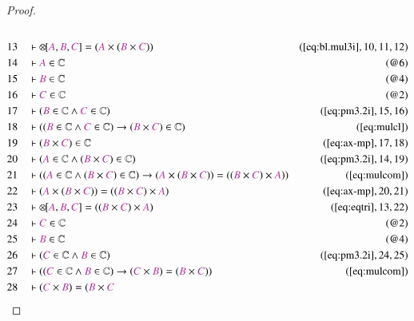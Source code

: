 \begin{proof}
\begin{align}
  \\ 13 &&  & \vdash {\otimes\hspace{-1pt}[} \mc{A} , \mc{B} , \mc{C} ] = (
      \mc{A} \times ( \mc{B} \times \mc{C} )
      )&(\mbox{\ref{eq:bl.mul3i}},10,11,12)\notag
  \\ 14 &&  & \vdash \mc{A} \in \mathbb{C}&(@6)\notag
  \\ 15 &&  & \vdash \mc{B} \in \mathbb{C}&(@4)\notag
  \\ 16 &&  & \vdash \mc{C} \in \mathbb{C}&(@2)\notag
  \\ 17 &&  & \vdash ( \mc{B} \in \mathbb{C} \wedge \mc{C} \in \mathbb{C}
      )&(\mbox{\ref{eq:pm3.2i}},15,16)\notag
  \\ 18 &&  & \vdash ( ( \mc{B} \in \mathbb{C} \wedge \mc{C} \in \mathbb{C} )
      \rightarrow ( \mc{B} \times \mc{C} ) \in \mathbb{C}
      )&(\mbox{\ref{eq:mulcl}})\notag
  \\ 19 &&  & \vdash ( \mc{B} \times \mc{C} ) \in
      \mathbb{C}&(\mbox{\ref{eq:ax-mp}},17,18)\notag
  \\ 20 &&  & \vdash ( \mc{A} \in \mathbb{C} \wedge ( \mc{B} \times \mc{C} ) \in
      \mathbb{C} )&(\mbox{\ref{eq:pm3.2i}},14,19)\notag
  \\ 21 &&  & \vdash ( ( \mc{A} \in \mathbb{C} \wedge ( \mc{B} \times \mc{C} )
      \in \mathbb{C} ) \rightarrow ( \mc{A} \times ( \mc{B}
      \times \mc{C} ) ) = ( ( \mc{B} \times \mc{C} ) \times
      \mc{A} ) )&(\mbox{\ref{eq:mulcom}})\notag
  \\ 22 &&  & \vdash ( \mc{A} \times ( \mc{B} \times \mc{C} ) ) = ( ( \mc{B}
      \times \mc{C} ) \times \mc{A}
      )&(\mbox{\ref{eq:ax-mp}},20,21)\notag
  \\ 23 &&  & \vdash {\otimes\hspace{-1pt}[} \mc{A} , \mc{B} , \mc{C} ] = ( (
      \mc{B} \times \mc{C} ) \times \mc{A}
      )&(\mbox{\ref{eq:eqtri}},13,22)\notag
  \\ 24 &&  & \vdash \mc{C} \in \mathbb{C}&(@2)\notag
  \\ 25 &&  & \vdash \mc{B} \in \mathbb{C}&(@4)\notag
  \\ 26 &&  & \vdash ( \mc{C} \in \mathbb{C} \wedge \mc{B} \in \mathbb{C}
      )&(\mbox{\ref{eq:pm3.2i}},24,25)\notag
  \\ 27 &&  & \vdash ( ( \mc{C} \in \mathbb{C} \wedge \mc{B} \in \mathbb{C} )
      \rightarrow ( \mc{C} \times \mc{B} ) = ( \mc{B} \times
      \mc{C} ) )&(\mbox{\ref{eq:mulcom}})\notag
  \\ 28 &&  & \vdash ( \mc{C} \times \mc{B} ) = ( \mc{B} \times \mc{C}

\end{align}
\end{proof}

